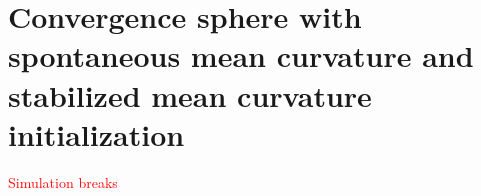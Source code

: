 \documentclass{article}
\newcommand{\logLogSlopeTriangle}[5]
{

    \pgfplotsextra
    {
        \pgfkeysgetvalue{/pgfplots/xmin}{\xmin}
        \pgfkeysgetvalue{/pgfplots/xmax}{\xmax}
        \pgfkeysgetvalue{/pgfplots/ymin}{\ymin}
        \pgfkeysgetvalue{/pgfplots/ymax}{\ymax}

        \pgfmathsetmacro{\xArel}{#1}
        \pgfmathsetmacro{\yArel}{#3}
        \pgfmathsetmacro{\xBrel}{#1-#2}
        \pgfmathsetmacro{\yBrel}{\yArel}
        \pgfmathsetmacro{\xCrel}{\xArel}

        \pgfmathsetmacro{\lnxB}{\xmin*(1-(#1-#2))+\xmax*(#1-#2)} %
        \pgfmathsetmacro{\lnxA}{\xmin*(1-#1)+\xmax*#1} %
        \pgfmathsetmacro{\lnyA}{\ymin*(1-#3)+\ymax*#3} %
        \pgfmathsetmacro{\lnyC}{\lnyA+#4*(\lnxA-\lnxB)}
        \pgfmathsetmacro{\yCrel}{\lnyC-\ymin)/(\ymax-\ymin)} %

        \coordinate (A) at (rel axis cs:\xArel,\yArel);
        \coordinate (B) at (rel axis cs:\xBrel,\yBrel);
        \coordinate (C) at (rel axis cs:\xCrel,\yCrel);

        \draw[#5]   (A)-- node[pos=0.5,anchor=north] {1}
                    (B)-- 
                    (C)-- node[pos=0.5,anchor=west] {#4}
                    cycle;
    }
}
\begin{document}
\section{Convergence sphere with spontaneous mean curvature and stabilized mean curvature initialization}


\textcolor{red}{Simulation breaks}

\end{document}
